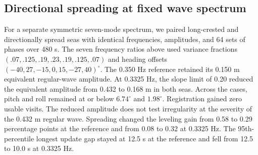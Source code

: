 \subsection{Directional spreading at fixed wave spectrum}

For a separate symmetric seven-mode spectrum, we paired long-crested and directionally spread seas with identical frequencies, amplitudes, and 64 sets of phases over 480 s. The seven frequency ratios above used variance fractions $(.07,.125,.19,.23,.19,.125,.07)$ and heading offsets $(-40,27,-15,0,15,-27,40)^\circ$. The 0.350 Hz reference retained its 0.150 m equivalent regular-wave amplitude. At 0.3325 Hz, the slope limit of 0.20 reduced the equivalent amplitude from 0.432 to 0.168 m in both seas. Across the cases, pitch and roll remained at or below $6.74^\circ$ and $1.98^\circ$. Registration gained zero usable visits. The reduced amplitude does not test irregularity at the severity of the 0.432 m regular wave. Spreading changed the leveling gain from 0.58 to 0.29 percentage points at the reference and from 0.08 to 0.32 at 0.3325 Hz. The 95th-percentile longest update gap stayed at 12.5 s at the reference and fell from 12.5 to 10.0 s at 0.3325 Hz.
